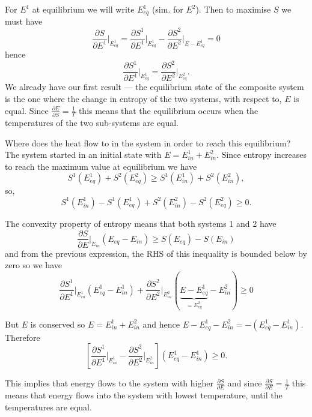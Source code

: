 For $E^1$ at equilibrium we will write $E^1_{eq}$ (sim. for $E^2$). Then to maximise $S$ we must have
$$
	\frac{\partial S}{\partial E^1}\bigg\vert_{E^1_{eq}} = \frac{\partial S^1}{\partial E^1}\bigg\vert_{E^1_{eq}} - \frac{\partial S^2}{\partial E^2}\bigg\vert_{E-E^1_{eq}}=0
$$
hence
$$
	\frac{\partial S^1}{\partial E^1}\vert_{E^1_{eq}} = \frac{\partial S^2}{\partial E^2}\vert_{E_{eq}^2}.
$$ We already have our first result --- the equilibrium state of the composite system is the one where the change in entropy of the two systems, with respect to, $E$ is equal. Since $\frac{\partial E}{\partial S} = \frac{1}{T}$ this means that the equilibrium occurs when the temperatures of the two sub-systems are equal.

Where does the heat flow to in the system in order to reach this equilibrium? The system started in an initial state with $E = E^1_{in}+E^2_{in}$. Since entropy increases to reach the maximum  value at equilibrium we have 
$$
	S^1(E^1_{eq}) + S^2(E^2_{eq}) \geq S^1(E^1_{in}) + S^2(E^2_{in}),
$$ 
so,
$$ 
	S^1(E^1_{in}) - S^1(E^1_{eq})  +  S^2(E^2_{in}) - S^2(E^2_{eq})\geq 0.
$$

The convexity property of entropy means that both systems  1 and 2 have 
$$
	\frac{\partial S}{\partial E}\vert_{E_{in}}(E_{eq}-E_{in})\geq S(E_{eq})-S(E_{in})
$$ 
and from the previous expression, the RHS of this inequality is bounded below by zero so we have
$$
	\frac{\partial S^1}{\partial E^1}\bigg\vert_{E^1_{in}}(E_{eq}^1-E_{in}^1) + \frac{\partial S^2}{\partial E^2}\bigg\vert_{E^2_{in}}(\underbrace{E-E_{eq}^1}_{=E^2_{eq}}-E_{in}^2)\geq0
$$

But $E$ is conserved so $E=E^1_{in}+E^2_{in}$ and hence $E-E^1_{eq}-E^2_{in} = -(E^1_{eq}-E^1_{in})$. Therefore
$$
	\left[\frac{\partial S^1}{\partial E^1}\bigg\vert_{E^1_{in}} - \frac{\partial S^2}{\partial E^2}\bigg\vert_{E^2_{in}}\right]\left(E^1_{eq}-E^1_{in}\right)\geq 0.
$$

This implies that energy flows to the  system with higher $\frac{\partial S}{\partial E}$ and since $\frac{\partial S}{\partial E}= \frac{1}{T}$ this means that energy flows into the system with lowest temperature, until the temperatures are equal.

